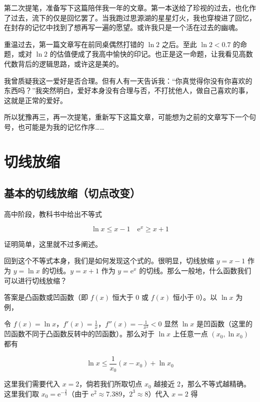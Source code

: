 \documentclass[12pt]{article}
\theoremstyle{definition}
\theoremstyle{plain}
\theoremstyle{definition}
\newcommand{\ee}{\mathrm{e}}
\begin{document}
第二次提笔，准备写下这篇陪伴我一年的文章。第一本送给了珍视的过去，也化作了过去，流下的仅是回忆罢了。当我跑过思源湖的星星灯火，我也穿梭进了回忆，在封存的记忆中找到了想再写一遍的愿望。或许我只是一个活在过去的幽魂。

重温过去，第一篇文章写在前同桌偶然打错的 \(\ln 2\) 之后。至此
\(\ln 2 < 0.7\) 的命题，或对 \(\ln 2\)
的估值便成了我高中愉快的印记。也正是这一命题，让我看见高数代数背后的逻辑思路，或许这是美的。

我曾质疑我这一爱好是否合理。但有人有一天告诉我：``你真觉得你没有你喜欢的东西吗？''我突然明白，爱好本身没有合理与否，不打扰他人，做自己喜欢的事，这就是正常的爱好。

所以犹豫再三，再一次提笔，重新写下这篇文章，可能想为之前的文章写下一个句号，也可能是为我的记忆作序\ldots\ldots

\newpage

\setcounter{page}{1}

\section{切线放缩}

\subsection{基本的切线放缩（切点改变）}

高中阶段，教科书中给出不等式

\[\ln x \leq x - 1\quad \ee^{x} \geq x + 1\]

证明简单，这里就不过多阐述。

回到这个不等式本身，我们是如何发现这个式的。很明显，切线放缩
\(y = x - 1\) 作为 \(y = \ln x\) 的切线。\(y = x + 1\) 作为 \(y = \ee^{x}\)
的切线。那么一般地，什么函数我们可以进行切线放缩？

答案是凸函数或凹函数（即 \(f(x)\) 恒大于 0 或 \(f(x)\) 恒小于 0）。以
\(\ln x\) 为例，

令
\(f(x) = \ln x\)，\(f'(x) = \frac{1}{x}\)，\(f''(x) = -\frac{1}{x^{2}} < 0\)
显然 \(\ln x\)
是凹函数（这里的凹函数不同于凸函数反转中的凹函数）。那么对于 \(\ln x\)
上任意一点 \(\left( x_{0},\ln x_{0} \right)\) 都有

\[\ln x \leq \frac{1}{x_{0}}\left( x - x_{0} \right) + \ln x_{0}\]

这里我们需要代入 \(x=2\)，倘若我们所取切点 \(x_0\) 越接近 2，那么不等式越精确。
这里我们取 \(x_0 = \ee^{-\frac{2}{3}}\)（由于 \(\ee^{2} \approx 7.389\)，\(2^{3} \approx 8\)）代入 \(x=2\) 得
\end{document}
